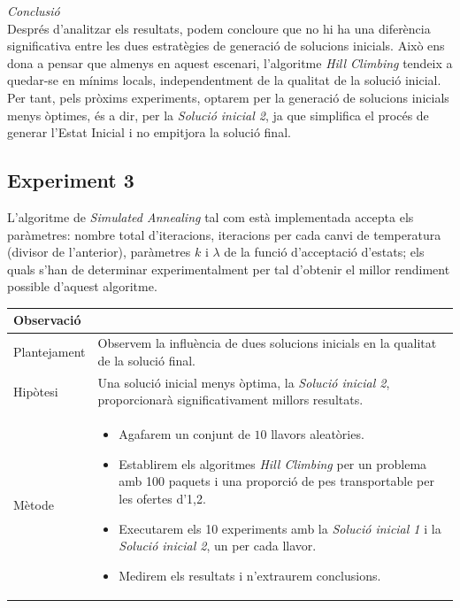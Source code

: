 \documentclass[a4paper]{article}
\begin{document}
	\textit{Conclusió} \\
	Després d'analitzar els resultats, podem concloure que no hi ha una diferència significativa entre les dues estratègies de generació de solucions inicials. Això ens dona a pensar que almenys en aquest escenari, l'algoritme \textit{Hill Climbing} tendeix a quedar-se en mínims locals, independentment de la qualitat de la solució inicial. Per tant, pels pròxims experiments, optarem per la generació de solucions inicials menys òptimes, és a dir, per la \textit{Solució inicial 2}, ja que simplifica el procés de generar l'Estat Inicial i no empitjora la solució final.\\
	
	\subsection{Experiment 3}

	L'algoritme de \textit{Simulated Annealing} tal com està implementada accepta els paràmetres: nombre total d'iteracions, iteracions per cada canvi de temperatura (divisor de l'anterior), paràmetres $k$ i $\lambda$ de la funció d'acceptació d'estats; els quals s'han de determinar experimentalment per tal d'obtenir el millor rendiment possible d'aquest algoritme.

	\begin{table}[ht]
		\centering
		\begin{tabular}{|l|p{10cm}|}
			\hline
			Observació & \\
			\hline
			Plantejament & Observem la influència de dues solucions inicials en la qualitat de la solució final. \\
			\hline
			Hipòtesi & Una solució inicial menys òptima, la \textit{Solució inicial 2}, proporcionarà significativament millors resultats.\\
			\hline
			Mètode &
			\begin{itemize}
				\item Agafarem un conjunt de $10$ llavors aleatòries.
				\item Establirem els algoritmes \textit{Hill Climbing} per un problema amb 100 paquets i una proporció de pes transportable per les ofertes d'1,2.
				\item Executarem els 10 experiments amb la \textit{Solució inicial 1} i la \textit{Solució inicial 2}, un per cada llavor.
				\item Medirem els resultats i n'extraurem conclusions.
			\end{itemize} \\
			\hline
		\end{tabular}
		\label{tab:exp3_apartats}
	\end{table}
\end{document}
